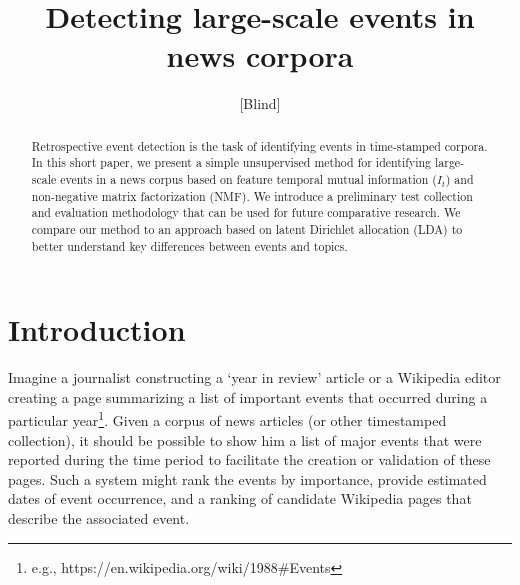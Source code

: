 \documentclass{sig-alternate}
\begin{document}

\author{[Blind]}

\title{Detecting large-scale events in news corpora}

\maketitle
\begin{abstract}
Retrospective event detection is the task of identifying events in time-stamped corpora. In this short paper, we present a simple unsupervised method for identifying large-scale events in a news corpus based on feature temporal mutual information ($I_t$) and non-negative matrix factorization (NMF). We introduce a preliminary test collection and evaluation methodology that can be used for future comparative research. We compare our method to an approach based on latent Dirichlet allocation (LDA) to better understand key differences between events and topics.

\end{abstract}



\section{Introduction}

Imagine a journalist constructing a `year in review' article or a Wikipedia editor creating a page summarizing a list of important events that occurred during a particular year\footnote{e.g., https://en.wikipedia.org/wiki/1988\#Events}. Given a corpus of news articles (or other timestamped collection), it should be possible to show him a list of major events that were reported during the time period to facilitate the creation or validation of these pages. Such a system might rank the events by importance, provide estimated dates of event occurrence, and a ranking of candidate Wikipedia pages that describe the associated event. 
\end{document}
